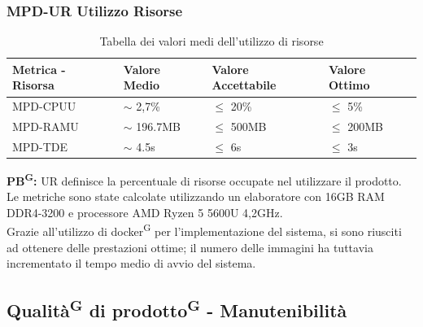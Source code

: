 \documentclass[8pt]{article}
\newcommand{\glossterm}[1]{#1\textsuperscript{G}} %
\begin{document}
\subsubsection{MPD-UR Utilizzo Risorse}
\renewcommand{\arraystretch}{2.5}
\begin{longtable}{|>{\centering}p{3.5cm}|>{\centering\arraybackslash}p{3cm}|>{\centering\arraybackslash}p{3.5cm}|>{\centering\arraybackslash}p{3cm}|}
    \hline
    \rowcolor{white}
    \textbf{Metrica - Risorsa} & \textbf{Valore Medio} & \textbf{Valore Accettabile} & \textbf{Valore Ottimo} \\
    \hline
    \endfirsthead 
    \rowcolor{white}
    \caption{Tabella dei valori medi dell'utilizzo di risorse} 
    \label{table:Tabella dei valori medi dell'utilizzo di risorse}
    \endlastfoot 
    MPD-CPUU & $\sim$ 2,7\% & $\leq$ 20\% & $\leq$ 5\% \\
    \hline 
    MPD-RAMU & $\sim$ 196.7MB & $\leq$ 500MB & $\leq$ 200MB \\
    \hline 
    MPD-TDE & $\sim$ 4.5s & $\leq$ 6s & $\leq$ 3s \\
    \hline
\end{longtable}
\textbf{\glossterm{PB}:} UR definisce la percentuale di risorse occupate nel utilizzare il prodotto. Le metriche sono state calcolate utilizzando un elaboratore con 16GB RAM DDR4-3200 e processore AMD Ryzen 5 5600U 4,2GHz.\\ Grazie all'utilizzo di \glossterm{docker} per l'implementazione del sistema, si sono riusciti ad ottenere delle prestazioni ottime; il numero delle immagini ha tuttavia incrementato il tempo medio di avvio del sistema.
\subsection{\glossterm{Qualità} di \glossterm{prodotto} - Manutenibilità}
\end{document}
